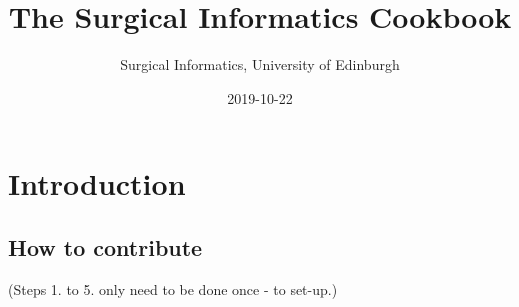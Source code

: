 \documentclass[]{book}
\title{The Surgical Informatics Cookbook}
\author{Surgical Informatics, University of Edinburgh}
\date{2019-10-22}
\begin{document}
\maketitle

{
\setcounter{tocdepth}{1}
\tableofcontents
}
\hypertarget{section}{%
\chapter*{}\label{section}}

\hypertarget{intro}{%
\chapter{Introduction}\label{intro}}

\hypertarget{how-to-contribute}{%
\section{How to contribute}\label{how-to-contribute}}

(Steps 1. to 5. only need to be done once - to set-up.)
\end{document}
